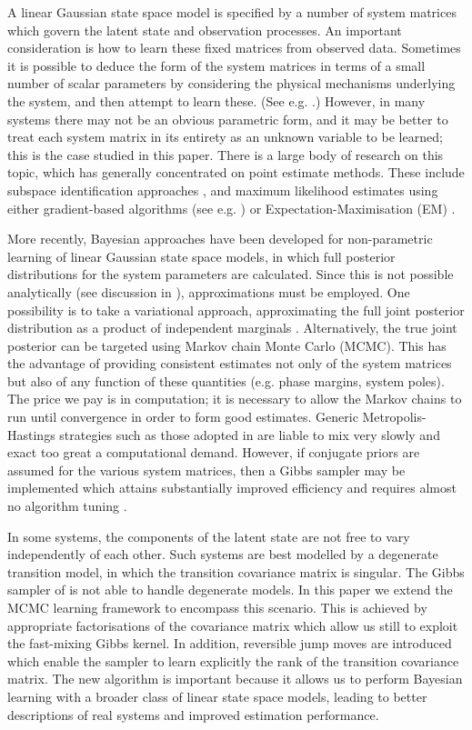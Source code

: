 \documentclass[journal,10pt]{IEEEtran}
\begin{document}
A linear Gaussian state space model is specified by a number of system matrices which govern the latent state and observation processes. An important consideration is how to learn these fixed matrices from observed data. Sometimes it is possible to deduce the form of the system matrices in terms of a small number of scalar parameters by considering the physical mechanisms underlying the system, and then attempt to learn these. (See e.g. \cite{Kantas2009,Andrieu2010}.) However, in many systems there may not be an obvious parametric form, and it may be better to treat each system matrix in its entirety as an unknown variable to be learned; this is the case studied in this paper. There is a large body of research on this topic, which has generally concentrated on point estimate methods. These include subspace identification approaches \cite{VanOverschee1991,Viberg1995}, and maximum likelihood estimates using either gradient-based algorithms (see e.g. \cite{Cappe2005,Sarkka2013}) or Expectation-Maximisation (EM) \cite{Shumway1982,Digalakis1993,Ghahramani1996,Gibson2005,Li2009}.

More recently, Bayesian approaches have been developed for non-parametric learning of linear Gaussian state space models, in which full posterior distributions for the system parameters are calculated. Since this is not possible analytically (see discussion in \cite{Beal2003}), approximations must be employed. One possibility is to take a variational approach, approximating the full joint posterior distribution as a product of independent marginals \cite{Ghahramani2001,Beal2003,Barber2007}. Alternatively, the true joint posterior can be targeted using Markov chain Monte Carlo (MCMC). This has the advantage of providing consistent estimates not only of the system matrices but also of any function of these quantities (e.g. phase margins, system poles). The price we pay is in computation; it is necessary to allow the Markov chains to run until convergence in order to form good estimates. Generic Metropolis-Hastings strategies such as those adopted in \cite{Ninness2010} are liable to mix very slowly and exact too great a computational demand. However, if conjugate priors are assumed for the various system matrices, then a Gibbs sampler may be implemented which attains substantially improved efficiency and requires almost no algorithm tuning \cite{Wills2012}.

In some systems, the components of the latent state are not free to vary independently of each other. Such systems are best modelled by a degenerate transition model, in which the transition covariance matrix is singular. The Gibbs sampler of \cite{Wills2012} is not able to handle degenerate models. In this paper we extend the MCMC learning framework to encompass this scenario. This is achieved by appropriate factorisations of the covariance matrix which allow us still to exploit the fast-mixing Gibbs kernel. In addition, reversible jump moves \cite{Green1995,Green2009} are introduced which enable the sampler to learn explicitly the rank of the transition covariance matrix. The new algorithm is important because it allows us to perform Bayesian learning with a broader class of linear state space models, leading to better descriptions of real systems and improved estimation performance.
\end{document}
